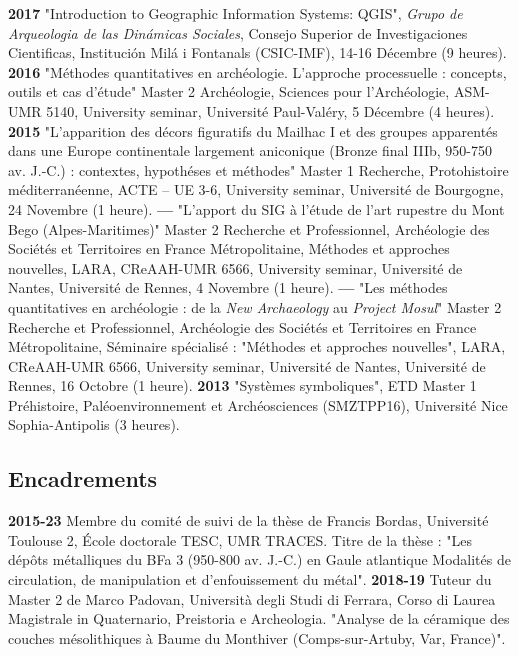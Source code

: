 \documentclass{article}
\begin{document}
\smallbreak 
\textbf{2017 }"Introduction to Geographic Information Systems: QGIS", \textit{Grupo de Arqueologia de las Din\'{a}micas Sociales}, Consejo Superior de Investigaciones Cientificas, Instituci\'{o}n Mil\'{a} i Fontanals (CSIC-IMF), 14-16 Décembre (9 heures).
\smallbreak
\textbf{2016 }"M\'{e}thodes quantitatives en arch\'{e}ologie. L'approche processuelle : concepts, outils et cas d'\'{e}tude" Master 2 Arch\'{e}ologie, Sciences pour l'Arch\'{e}ologie, ASM-UMR 5140, University seminar, Universit\'{e} Paul-Val\'{e}ry, 5 Décembre (4 heures).
\smallbreak
\textbf{2015 }"L'apparition des d\'{e}cors figuratifs du Mailhac I et des groupes apparent\'{e}s dans une Europe continentale largement aniconique (Bronze final IIIb, 950-750 av. J.-C.) : contextes, hypoth\'{e}ses et m\'{e}thodes" Master 1 Recherche, Protohistoire m\'{e}diterran\'{e}enne, ACTE -- UE 3-6, University seminar, Universit\'{e} de Bourgogne, 24 Novembre (1 heure).
\smallbreak
\textbf{--- }"L'apport du SIG \`{a} l'\'{e}tude de l'art rupestre du Mont Bego (Alpes-Maritimes)" Master 2 Recherche et Professionnel, Arch\'{e}ologie des Soci\'{e}t\'{e}s et Territoires en France M\'{e}tropolitaine, M\'{e}thodes et approches nouvelles, LARA, CReAAH-UMR 6566, University seminar, Universit\'{e} de Nantes, Universit\'{e} de Rennes, 4 Novembre (1 heure).
\smallbreak
\textbf{--- }"Les m\'{e}thodes quantitatives en arch\'{e}ologie : de la \textit{New Archaeology} au \textit{Project Mosul}" Master 2 Recherche et Professionnel, Arch\'{e}ologie des Soci\'{e}t\'{e}s et Territoires en France M\'{e}tropolitaine, S\'{e}minaire sp\'{e}cialis\'{e} : "M\'{e}thodes et approches nouvelles", LARA, CReAAH-UMR 6566, University seminar, Universit\'{e} de Nantes, Universit\'{e} de Rennes, 16 Octobre (1 heure).
\smallbreak
\textbf{2013 } "Systèmes symboliques", ETD Master 1 Préhistoire, Paléoenvironnement et Archéosciences (SMZTPP16), Université Nice Sophia-Antipolis (3 heures).

\subsection*{Encadrements}

\textbf{2015-23} Membre du comité de suivi de la thèse de Francis Bordas, Université Toulouse 2, École doctorale TESC, UMR TRACES. Titre de la thèse : "Les dépôts métalliques du BFa 3 (950-800 av. J.-C.) en Gaule atlantique Modalités de circulation, de manipulation et d’enfouissement du métal".
\smallbreak
\textbf{2018-19} Tuteur du Master 2 de Marco Padovan, Università degli Studi di Ferrara, Corso di Laurea Magistrale in Quaternario, Preistoria e Archeologia. "Analyse de la céramique des couches mésolithiques à Baume du Monthiver (Comps-sur-Artuby, Var, France)".
\end{document}
